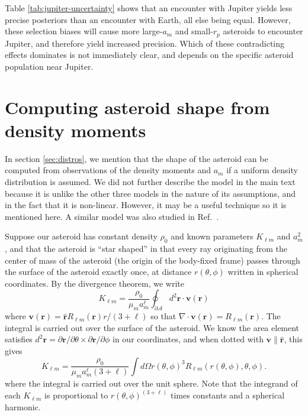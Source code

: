 \documentclass[fleqn,usenatbib]{mnras}
\newcommand{\unit}[1]{\bm{\hat{#1}}}
\begin{document}
Table \ref{tab:jupiter-uncertainty} shows that an encounter with Jupiter yields less precise posteriors than an encounter with Earth, all else being equal. However, these selection biases will cause more large-$a_m$ and small-$r_p$ asteroids to encounter Jupiter, and therefore yield increased precision. Which of these contradicting effects dominates is not immediately clear, and depends on the specific asteroid population near Jupiter.
  

\section{Computing asteroid shape from density moments}
\label{app:find-surface}

In section \ref{sec:distros}, we mention that the shape of the asteroid can be computed from observations of the density moments and $a_m$ if a uniform density distribution is assumed. We did not further describe the model in the main text because it is unlike the other three models in the nature of its assumptions, and in the fact that it is non-linear. However, it may be a useful technique so it is mentioned here. A similar model was also studied in Ref.~\cite{BAXANSKY2007756}.

Suppose our asteroid has constant density $\rho_0$ and known parameters $K_{\ell m}$ and $a_m^2$, and that the asteroid is ``star shaped'' in that every ray originating from the center of mass of the asteroid (the origin of the body-fixed frame) passes through the surface of the asteroid exactly once, at distance $r(\theta, \phi)$ written in spherical coordinates. By the divergence theorem, we write
\begin{equation}
  K_{\ell m} = \frac{\rho_0}{\mu_m a_m^\ell} \oint_{\partial \mathcal{A}} d^2 \bm r \cdot \bm v (\bm r)
\end{equation}
where $\bm v (\bm r) = \unit r R_{\ell m} (\bm r) r / (3+\ell) $ so that $\nabla \cdot \bm v(\bm r) = R_{\ell m}(\bm r)$. The integral is carried out over the surface of the asteroid. We know the area element satisfies $d^2 \bm r = \partial \bm r / \partial \theta \times \partial \bm r / \partial \phi$ in our coordinates, and when dotted with $\bm v \parallel \unit r$, this gives
\begin{equation}
  K_{\ell m} = \frac{\rho_0 }{\mu_m a_m^\ell (3 + \ell)} \int d\Omega r(\theta, \phi)^3 R_{\ell m}(r(\theta, \phi), \theta, \phi).
  \label{eqn:surface-klm}
\end{equation}
where the integral is carried out over the unit sphere. Note that the integrand of each $K_{\ell m}$ is proportional to $r(\theta, \phi)^{(3+\ell)}$ times constants and a spherical harmonic.
\end{document}

